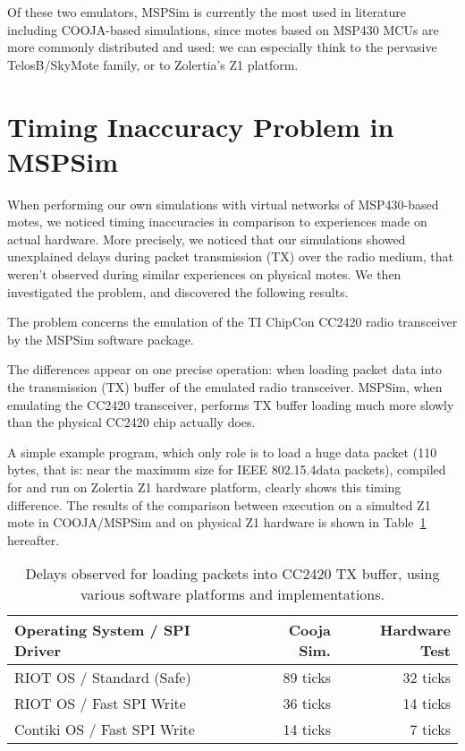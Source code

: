 \documentclass[a4paper,10pt]{article}
\begin{document}
Of these two emulators, MSPSim is currently the most used in literature
including COOJA-based simulations, since motes based on MSP430 MCUs are
more commonly distributed and used: we can especially think to the pervasive
TelosB/SkyMote family, or to Zolertia's Z1 platform.


\section{Timing Inaccuracy Problem in MSPSim}

When performing our own simulations with virtual networks of MSP430-based
motes, we noticed timing inaccuracies in comparison to experiences made
on actual hardware. More precisely, we noticed that our simulations showed
unexplained delays during packet transmission (TX) over the radio medium,
that weren't observed during similar experiences on physical motes.
We then investigated the problem, and discovered the following results.

The problem concerns the emulation of the TI ChipCon CC2420 radio
transceiver by the MSPSim software package.

The differences appear on one precise operation: when loading packet data
into the transmission (TX) buffer of the emulated radio transceiver.
MSPSim, when emulating the CC2420 transceiver, performs TX buffer loading
much more slowly than the physical CC2420 chip actually does.

A simple example program, which only role is to load a huge data packet
(110 bytes, that is: near the maximum size for IEEE
802.15.4\footnotemark[1] data packets), compiled for and run on
Zolertia Z1 hardware platform, clearly shows this timing difference.
The results of the comparison between execution on a simulted Z1 mote
in COOJA/MSPSim and on physical Z1 hardware is shown in
Table~\ref{TblTXPktLoadDelays} hereafter.


\begin{table}[!h]
\centering
\begin{tabular}{|l|r|r|}
\hline
Operating System / SPI Driver &  Cooja Sim.  & Hardware Test \\
\hline
RIOT OS / Standard (Safe)     &   89 ticks   &  32 ticks \\ 
RIOT OS / Fast SPI Write      &   36 ticks   &  14 ticks \\
Contiki OS / Fast SPI Write   &   14 ticks   &   7 ticks \\
\hline
\end{tabular}
\caption{\small Delays observed for loading packets into CC2420 TX buffer,
using various software platforms and implementations.}
\label{TblTXPktLoadDelays}
\end{table}
\end{document}
